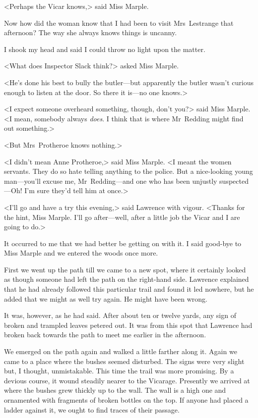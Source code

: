 <Perhaps the Vicar knows,> said Miss Marple.

Now how did the woman know that I had been to visit Mrs~Lestrange that afternoon? The way she always knows things is uncanny.

I shook my head and said I could throw no light upon the matter.

<What does Inspector Slack think?> asked Miss Marple.

<He's done his best to bully the butler—but apparently the butler wasn't curious enough to listen at the door. So there it is—no one knows.>

<I expect someone overheard something, though, don't you?> said Miss Marple. <I mean, somebody always \emph{does}. I think that is where Mr~Redding might find out something.>

<But Mrs~Protheroe knows nothing.>

<I didn't mean Anne Protheroe,> said Miss Marple. <I meant the women servants. They do so hate telling anything to the police. But a nice-looking young man—you'll excuse me, Mr~Redding—and one who has been unjustly suspected—Oh! I'm sure they'd tell him at once.>

<I'll go and have a try this evening,> said Lawrence with vigour. <Thanks for the hint, Miss Marple. I'll go after—well, after a little job the Vicar and I are going to do.>

It occurred to me that we had better be getting on with it. I said good-bye to Miss Marple and we entered the woods once more.

First we went up the path till we came to a new spot, where it certainly looked as though someone had left the path on the right-hand side. Lawrence explained that he had already followed this particular trail and found it led nowhere, but he added that we might as well try again. He might have been wrong.

It was, however, as he had said. After about ten or twelve yards, any sign of broken and trampled leaves petered out. It was from this spot that Lawrence had broken back towards the path to meet me earlier in the afternoon.

We emerged on the path again and walked a little farther along it. Again we came to a place where the bushes seemed disturbed. The signs were very slight but, I thought, unmistakable. This time the trail was more promising. By a devious course, it wound steadily nearer to the Vicarage. Presently we arrived at where the bushes grew thickly up to the wall. The wall is a high one and ornamented with fragments of broken bottles on the top. If anyone had placed a ladder against it, we ought to find traces of their passage.

